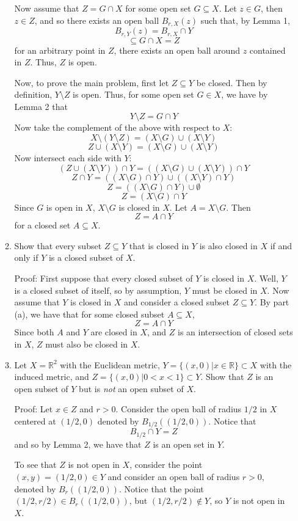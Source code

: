 \documentclass{article}
\begin{document}
\begin{enumerate}
\begin{enumerate}
        Now assume that $Z = G \cap X$ for some open set $G \subseteq X$. Let $z \in G$, then $z \in Z$, and so there exists an open ball $B_{r,X}(z)$ such that, by Lemma 1,
        \[B_{r, Y}(z) = B_{r,X} \cap Y\]
        \[\subseteq G \cap X = Z\]
        for an arbitrary point in $Z$, there exists an open ball around $z$ contained in $Z$. Thus, $Z$ is open.
        
        Now, to prove the main problem, first let $Z \subseteq Y$ be closed. Then by definition, $Y \setminus Z$ is open. Thus, for some open set $G \in X$, we have by Lemma 2 that 
        \[Y \setminus Z = G \cap Y\]
        Now take the complement of the above with respect to $X$:
        \[X \setminus (Y \setminus Z) = (X \setminus G) \cup (X \setminus Y)\]
        \[Z \cup (X \setminus Y) = (X \setminus G) \cup (X \setminus Y)\]
        Now intersect each side with $Y$:
        \[(Z \cup (X \setminus Y)) \cap Y = ((X \setminus G) \cup (X \setminus Y)) \cap Y\]
        \[Z \cap Y = ((X \setminus G) \cap Y) \cup ((X \setminus Y) \cap Y)\]
        \[Z = ((X \setminus G) \cap Y) \cup \emptyset\]
        \[Z = (X \setminus G) \cap Y\]
        Since $G$ is open in $X$, $X \setminus G$ is closed in $X$. Let $A = X \setminus G$. Then
        \[Z = A \cap Y\]
        for a closed set $A \subseteq X$.
        
        \item Show that every subset $Z \subseteq Y$ that is closed in $Y$ is also closed in $X$ if and only if $Y$ is a closed subset of $X$.
        
        Proof: First suppose that every closed subset of $Y$ is closed in $X$. Well, $Y$ is a closed subset of itself, so by assumption, $Y$ must be closed in $X$. Now assume that $Y$ is closed in $X$ and consider a closed subset $Z \subseteq Y$. By part (a), we have that for some closed subset $A \subseteq X$,
        \[Z = A \cap Y\]
        Since both $A$ and $Y$ are closed in $X$, and $Z$ is an intersection of closed sets in $X$, $Z$ must also be closed in $X$.
        
        \item Let $X = \mathbb{R}^2$ with the Euclidean metric, $Y = \{(x,0) | x\in \mathbb{R}\} \subset X$ with the induced metric, and $Z = \{(x,0)| 0 < x < 1\} \subset Y$. Show that $Z$ is an open subset of $Y$ but is \textit{not} an open subset of $X$.
        
        Proof: Let $x \in Z$ and $r > 0$. Consider the open ball of radius $1/2$ in $X$ centered at $(1/2,0)$ denoted by $B_{1/2}((1/2,0))$. Notice that 
        \[B_{1/2} \cap Y = Z\]
        and so by Lemma 2, we have that $Z$ is an open set in $Y$.
        
        To see that $Z$ is not open in $X$, consider the point $(x,y) = (1/2, 0) \in Y$ and consider an open ball of radius $r>0$, denoted by $B_r((1/2,0))$. Notice that the point $(1/2, r/2) \in B_r((1/2,0))$, but $(1/2, r/2) \notin Y$, so $Y$ is not open in $X$.
    \end{enumerate}
\end{enumerate}
\end{document}
